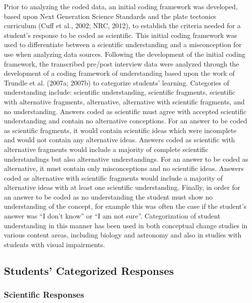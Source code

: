 \documentclass[11.5pt]{sig-alternate} %
\begin{document}
\begin{large}
Prior to analyzing the coded data, an initial coding framework was developed, based upon Next Generation Science Standards and the plate tectonics curriculum (Cuff et al., 2002; NRC, 2012), to establish the criteria needed for a student’s response to be coded as scientific. This initial coding framework was used to differentiate between a scientific understanding and a misconception for use when analyzing data sources.  Following the development of the initial coding framework, the transcribed pre/post interview data were analyzed through the development of a coding framework of understanding based upon the work of Trundle et al. (2007a; 2007b) to categorize students’ learning.  Categories of understanding include: scientific understanding, scientific fragments, scientific with alternative fragments, alternative, alternative with scientific fragments, and no understanding.  Answers coded as scientific must agree with accepted scientific understanding and contain no alternative conceptions.  For an answer to be coded as scientific fragments, it would contain scientific ideas which were incomplete and would not contain any alternative ideas.  Answers coded as scientific with alternative fragments would include a majority of complete scientific understandings but also alternative understandings.  For an answer to be coded as alternative, it must contain only misconceptions and no scientific ideas.  Answers coded as alternative with scientific fragments would include a majority of alternative ideas with at least one scientific understanding.  Finally, in order for an answer to be coded as no understanding the student must show no understanding of the concept, for example this was often the case if the student’s answer was “I don’t know” or “I am not sure”.  Categorization of student understanding in this manner has been used in both conceptual change studies in various content areas, including biology and astronomy and also in studies with students with visual impairments. 

\subsection*{Students’ Categorized Responses}

\subsubsection*{Scientific Responses}
 

\end{large}
\end{document}
